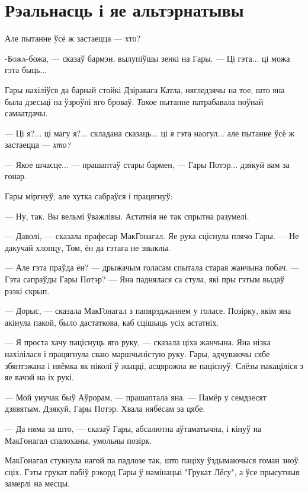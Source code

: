\chapter{Рэальнасць і яе альтэрнатывы}

\begin{chapterOpeningQuote}
Але пытанне ўсё ж застаецца --- хто?
\end{chapterOpeningQuote}

\lettrine{-Б}{ожа}-божа, --- сказаў бармэн, вылупіўшы зенкі на Гары. --- Ці гэта... ці можа
гэта быць...

Гары нахіліўся да барнай стойкі Дзіравага Катла, нягледзячы на тое, што яна была дзесьці на 
ўзроўні яго броваў. \emph{Такое} пытанне патрабавала поўнай самаатдачы.

--- Ці я?... ці магу я?... складана сказаць... ці \emph{я} гэта наогул... але пытанне ўсё ж
застаецца --- \emph{хто?}

--- Якое шчасце... --- прашаптаў стары бармен, --- Гары Потэр... дзякуй вам за гонар.

Гары міргнуў, але хутка сабраўся і працягнуў:

--- Ну, так. Вы вельмі ўважлівы. Астатнія не так спрытна разумелі.

--- Даволі, --- сказала прафесар МакГонагал. Яе рука сціснула плячо Гары. --- Не дакучай хлопцу,
Том, ён да гэтага не звыклы.

--- Але гэта праўда ён? --- дрыжачым голасам спытала старая жанчына побач. --- Гэта сапраўды
Гары Потэр? --- Яна паднялася са стула, які пры гэтым выдаў рэзкі скрып.

--- Дорыс, --- сказала МакГонагал з папярэджаннем у голасе. Позірку, якім яна акінула пакой, было
дастаткова, каб сцішыць усіх астатніх.

--- Я проста хачу паціснуць яго руку, --- сказала ціха жанчына. Яна нізка нахілілася і працягнула
сваю маршчыністую руку. Гары, адчуваючы сябе збянтэжана і няёмка як ніколі ў жыцці, асцярожна яе
паціснуў. Слёзы пакаціліся з яе вачэй на іх рукі. 

--- Мой унучак быў Аўрорам, --- прашаптала яна. --- Памёр у семдзесят дзявятым. Дзякуй, Гары Потэр.
Хвала нябёсам за цябе.

--- Да няма за што, --- сказаў Гары, абсалютна аўтаматычна, і кінуў на МакГонагал спалоханы,
умольны позірк.

МакГонагал стукнула нагой па падлозе так, што паціху ўздымаючыся гоман зноў сціх. Гэты грукат 
пабіў рэкорд Гары ў намінацыі "Грукат Лёсу", а ўсе прысутныя замерлі на месцы.

